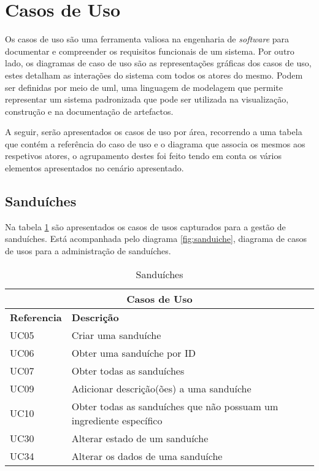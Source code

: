 \begin{flushright}
\cite{top10}
\end{flushright}


\section{Casos de Uso}

Os casos de uso são uma ferramenta valiosa na engenharia de \textit{software} para documentar e compreender os requisitos funcionais de um sistema. Por outro lado, os diagramas de caso de uso são as representações gráficas dos casos de uso, estes detalham as interações do sistema com todos os atores do mesmo. Podem ser definidas por meio de \ac{uml}, uma linguagem de modelagem que permite representar um sistema padronizada que pode ser utilizada na visualização, construção e na documentação de artefactos.

A seguir, serão apresentados os casos de uso por área, recorrendo a uma tabela que contém a referência do caso de uso e o diagrama que associa os mesmos aos respetivos atores, o agrupamento destes foi feito tendo em conta os vários elementos apresentados no cenário apresentado.

\subsection{Sanduíches}

Na tabela \ref{table:sanduiche} são apresentados os casos de usos capturados para a gestão de sanduíches. Está acompanhada pelo diagrama \ref{fig:sanduiche}, diagrama de casos de usos para a administração de sanduíches.

\begin{table}[H]
\caption{Sanduíches}
\label{table:sanduiche}
\begin{center}
\begin{tabular}{ |p{2cm}|p{10cm}|  }
\hline
\multicolumn{2}{|c|}{Casos de Uso} \\
\hline
\textbf{Referencia} & \textbf{Descrição} \\
\hline
UC05 & Criar uma sanduíche\\
\hline
UC06 & Obter uma sanduíche por ID\\
\hline
UC07 & Obter todas as sanduíches\\
\hline
UC09 & Adicionar descrição(ões) a uma sanduíche\\
\hline
UC10 & Obter todas as sanduíches que não possuam um ingrediente específico\\
\hline
UC30 & Alterar estado de um sanduíche\\
\hline
UC34 & Alterar os dados de uma sanduíche \\

\hline
\end{tabular} 
\end{center}
\end{table}

